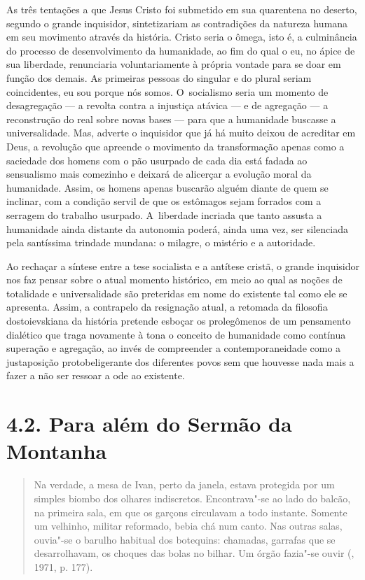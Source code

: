 As três tentações a que Jesus Cristo foi submetido em sua quarentena no
deserto, segundo o grande inquisidor, sintetizariam as contradições da
natureza humana em seu movimento através da história. Cristo seria o
ômega, isto é, a culminância do processo de desenvolvimento da
humanidade, ao fim do qual o eu, no ápice de sua liberdade, renunciaria
voluntariamente à própria vontade para se doar em função dos demais. As
primeiras pessoas do singular e do plural seriam coincidentes, eu sou
porque nós somos. O~socialismo seria um momento de desagregação --- a
revolta contra a injustiça atávica --- e de agregação --- a reconstrução
do real sobre novas bases --- para que a humanidade buscasse a
universalidade. Mas, adverte o inquisidor que já há muito deixou de
acreditar em Deus, a revolução que apreende o movimento da transformação
apenas como a saciedade dos homens com o pão usurpado de cada dia está
fadada ao sensualismo mais comezinho e deixará de alicerçar a evolução
moral da humanidade. Assim, os homens apenas buscarão alguém diante de
quem se inclinar, com a condição servil de que os estômagos sejam
forrados com a serragem do trabalho usurpado. A~liberdade incriada que
tanto assusta a humanidade ainda distante da autonomia poderá, ainda uma
vez, ser silenciada pela santíssima trindade mundana: o milagre, o
mistério e a autoridade.

Ao rechaçar a síntese entre a tese socialista e a antítese cristã, o
grande inquisidor nos faz pensar sobre o atual momento histórico, em
meio ao qual as noções de totalidade e universalidade são preteridas em
nome do existente tal como ele se apresenta. Assim, a contrapelo da
resignação atual, a retomada da filosofia dostoievskiana da história
pretende esboçar os prolegômenos de um pensamento dialético que traga
novamente à tona o conceito de humanidade como contínua superação e
agregação, ao invés de compreender a contemporaneidade como a
justaposição protobeligerante dos diferentes povos sem que houvesse nada
mais a fazer a não ser ressoar a ode ao existente.

\section{4.2. Para além do Sermão da Montanha}

\begin{quote}
Na verdade, a mesa de Ivan, perto da janela, estava protegida por um
simples biombo dos olhares indiscretos. Encontrava"-se ao lado do balcão,
na primeira sala, em que os garçons circulavam a todo instante. Somente
um velhinho, militar reformado, bebia chá num canto. Nas outras salas,
ouvia"-se o barulho habitual dos botequins: chamadas, garrafas que se
desarrolhavam, os choques das bolas no bilhar. Um órgão fazia"-se ouvir
(, 1971, p. 177).
\end{quote}

